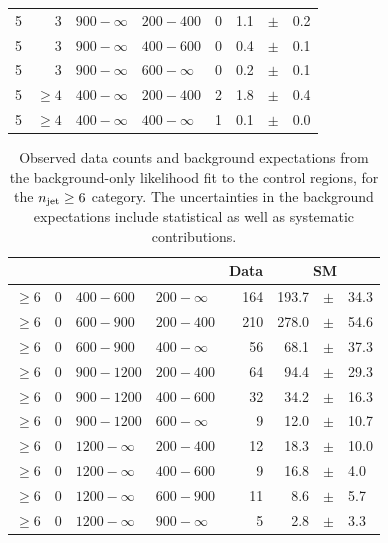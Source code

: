 \begin{table}[!h]
\begin{tabular}{rrllrrcl}
		5\T & 3 & $ 900- \infty$ & $200-400$ &      0 &      1.1 &$\pm$&    0.2 
		\\
		5 & 3 & $ 900- \infty$ & $400-600$ &      0 &      0.4 &$\pm$&    0.1 \\
		5 & 3 & $ 900- \infty$ & $600-\infty$ &      0 &      0.2 &$\pm$&    
		0.1 \\
		5\T & $\geq 4$ & $ 400- \infty$ & $200-400$ &      2 &      1.8 
		&$\pm$&    0.4 \\
		5 & $\geq 4$ & $ 400- \infty$ & $400-\infty$ &      1 &      0.1 
		&$\pm$&    0.0 \\
		\hline
	\end{tabular}
\end{table}

\clearpage
\begin{table}[!h]
	\caption{
		Observed data counts and background expectations from the 
		background-only likelihood fit to the control regions, for the 
		$n_{\text{jet}}\ge6$ category. The uncertainties in the background expectations 
		include statistical as well as systematic contributions. 
	}
	\label{tab:cronly_sr_result-ge6j}
	\scriptsize
	\centering
	\begin{tabular}{rrllrrcl}
		\hline
		\njet\T\B & \nb & \scalht [GeV] & \mht [GeV] & Data & 
		\multicolumn{3}{c}{SM} \\ 
		\hline
		$\geq 6$\T & 0 & $ 400- 600$ & $200-\infty$ &    164 &    193.7 
		&$\pm$&   34.3 \\
		$\geq 6$\T & 0 & $ 600- 900$ & $200-400$ &    210 &    278.0 &$\pm$&   
		54.6 \\
		$\geq 6$ & 0 & $ 600- 900$ & $400-\infty$ &     56 &     68.1 &$\pm$&   
		37.3 \\
		$\geq 6$\T & 0 & $ 900-1200$ & $200-400$ &     64 &     94.4 &$\pm$&   
		29.3 \\
		$\geq 6$ & 0 & $ 900-1200$ & $400-600$ &     32 &     34.2 &$\pm$&   
		16.3 \\
		$\geq 6$ & 0 & $ 900-1200$ & $600-\infty$ &      9 &     12.0 &$\pm$&   
		10.7 \\
		$\geq 6$\T & 0 & $1200- \infty$ & $200-400$ &     12 &     18.3 
		&$\pm$&   10.0 \\
		$\geq 6$ & 0 & $1200- \infty$ & $400-600$ &      9 &     16.8 
		&$\pm$&    4.0 \\
		$\geq 6$ & 0 & $1200- \infty$ & $600-900$ &     11 &      8.6 
		&$\pm$&    5.7 \\
		$\geq 6$ & 0 & $1200- \infty$ & $900-\infty$ &      5 &      2.8 
		&$\pm$&    3.3 \\

\end{tabular}
\end{table}
